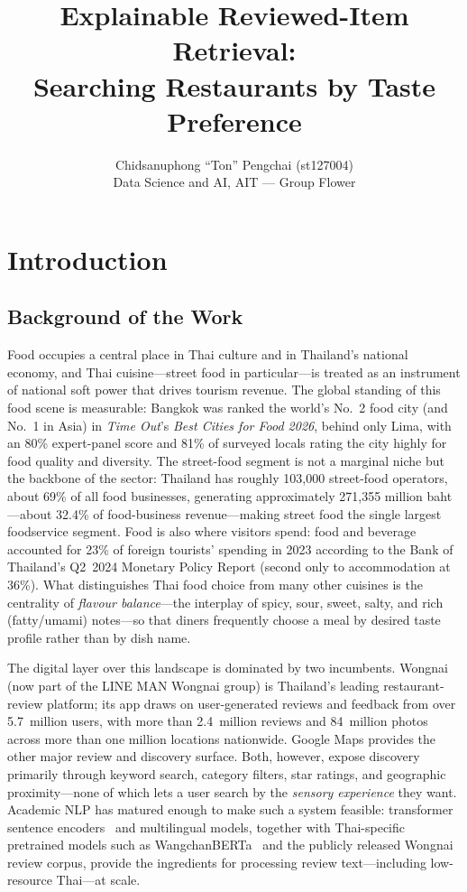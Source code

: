 \documentclass[10pt,twocolumn]{article}
\title{Explainable Reviewed-Item Retrieval:\\Searching Restaurants by Taste Preference}
\author{Chidsanuphong ``Ton'' Pengchai (st127004)\\Data Science and AI, AIT --- Group Flower}
\date{}
\begin{document}
\maketitle

\section{Introduction}

\subsection{Background of the Work}
Food occupies a central place in Thai culture and in Thailand's national economy,
and Thai cuisine---street food in particular---is treated as an instrument of
national soft power that drives tourism revenue. The global standing of this food
scene is measurable: Bangkok was ranked the world's No.~2 food city (and No.~1 in
Asia) in \emph{Time Out}'s \emph{Best Cities for Food 2026}, behind only Lima, with
an 80\% expert-panel score and 81\% of surveyed locals rating the city highly for
food quality and diversity. The street-food segment is not a marginal niche but the
backbone of the sector: Thailand has roughly 103{,}000 street-food operators, about
69\% of all food businesses, generating approximately 271{,}355 million baht---about
32.4\% of food-business revenue---making street food the single largest foodservice
segment. Food is also where visitors spend: food and beverage accounted for 23\% of
foreign tourists' spending in 2023 according to the Bank of Thailand's Q2~2024
Monetary Policy Report (second only to accommodation at 36\%). What distinguishes
Thai food choice from many other cuisines is the centrality of \emph{flavour
balance}---the interplay of spicy, sour, sweet, salty, and rich (fatty/umami)
notes---so that diners frequently choose a meal by desired taste profile rather than
by dish name.

The digital layer over this landscape is dominated by two incumbents. Wongnai (now
part of the LINE MAN Wongnai group) is Thailand's leading restaurant-review platform;
its app draws on user-generated reviews and feedback from over 5.7~million users,
with more than 2.4~million reviews and 84~million photos across more than one million
locations nationwide. Google Maps provides the other major review and discovery
surface. Both, however, expose discovery primarily through keyword search, category
filters, star ratings, and geographic proximity---none of which lets a user search by
the \emph{sensory experience} they want. Academic NLP has matured enough to make such
a system feasible: transformer sentence encoders~\cite{devlin2019bert,reimers2019sbert}
and multilingual models, together with Thai-specific pretrained models such as
WangchanBERTa~\cite{lowphansirikul2021wangchanberta} and the publicly released Wongnai
review corpus, provide the ingredients for processing review text---including
low-resource Thai---at scale.
\end{document}
